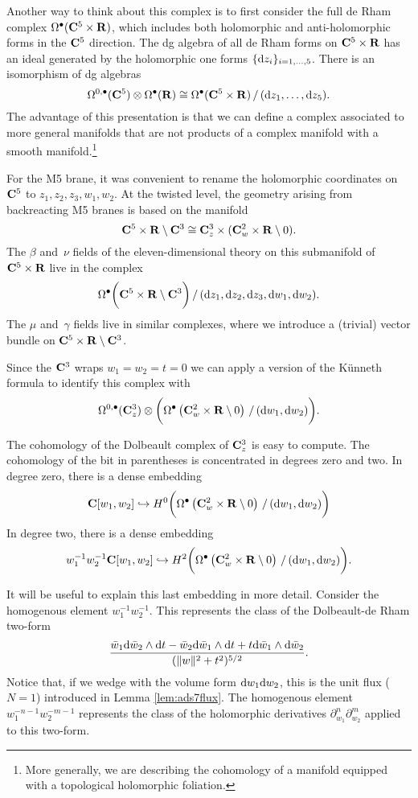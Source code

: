 \documentclass[../main.tex]{subfiles}
\begin{document}
Another way to think about this complex is to first consider the full de Rham complex $\Omega^\bullet(\mathbf{C}^5 \times \mathbf{R})$, which includes both holomorphic and anti-holomorphic forms in the $\mathbf{C}^5$ direction. 
The dg algebra of all de Rham forms on $\mathbf{C}^5 \times \mathbf{R}$ has an ideal generated by the holomorphic one forms $\{\mathrm{d} z_i\}_{i=1,\ldots,5}$.
There is an isomorphism of dg algebras
\[
\Omega^{0,\bullet}(\mathbf{C}^5) \otimes \Omega^\bullet(\mathbf{R}) \cong \Omega^\bullet(\mathbf{C}^5 \times \mathbf{R}) \, / \, (\mathrm{d} z_1,\ldots, \mathrm{d} z_5) .
\]
The advantage of this presentation is that we can define a complex associated to more general manifolds that are not products of a complex manifold with a smooth manifold.\footnote{More generally, we are describing the cohomology of a manifold equipped with a topological holomorphic foliation.}

For the M5 brane, it was convenient to rename the holomorphic coordinates on $\mathbf{C}^5$ to $z_1,z_2,z_3,w_1,w_2$. 
At the twisted level, the geometry arising from backreacting M5 branes is based on the manifold 
\[
\mathbf{C}^5 \times \mathbf{R} \setminus \mathbf{C}^3 \cong \mathbf{C}_z^3 \times (\mathbf{C}^2_w \times \mathbf{R} \setminus 0) .
\]
The $\beta$ and~$\nu$ fields of the eleven-dimensional theory on this submanifold of $\mathbf{C}^5 \times \mathbf{R}$ live in the complex 
\[
\Omega^\bullet\bigg(\mathbf{C}^5 \times \mathbf{R} \setminus \mathbf{C}^3\bigg) \, / \, (\mathrm{d} z_1,\mathrm{d} z_2,\mathrm{d} z_3, \mathrm{d} w_1, \mathrm{d} w_2)  .
\]
The $\mu$ and~$\gamma$ fields live in similar complexes, where we introduce a (trivial) vector bundle on $\mathbf{C}^5 \times \mathbf{R} \setminus \mathbf{C}^3$. 

Since the $\mathbf{C}^3$ wraps $w_1=w_2=t=0$ we can apply a version of the K\"unneth formula to identify this complex with 
\[
\Omega^{0,\bullet}(\mathbf{C}^3_z) \otimes \bigg( \Omega^\bullet\left(\mathbf{C}^2_w \times \mathbf{R} \setminus 0 \right) \, / \, (\mathrm{d} w_1, \mathrm{d} w_2) \bigg).
\]

The cohomology of the Dolbeault complex of $\mathbf{C}^3_z$ is easy to compute. 
The cohomology of the bit in parentheses is concentrated in degrees zero and two. 
In degree zero, there is a dense embedding
\[
\mathbf{C}[w_1,w_2] \hookrightarrow H^0 \bigg( \Omega^\bullet\left(\mathbf{C}^2_w \times \mathbf{R} \setminus 0 \right) \, / \, (\mathrm{d} w_1, \mathrm{d} w_2) \bigg)
\]
In degree two, there is a dense embedding
\[
w_{1}^{-1} w_2^{-1} \mathbf{C}[w_1,w_2] \hookrightarrow H^2 \bigg( \Omega^\bullet\left(\mathbf{C}^2_w \times \mathbf{R} \setminus 0 \right) \, / \, (\mathrm{d} w_1, \mathrm{d} w_2) \bigg).
\]

It will be useful to explain this last embedding in more detail. 
Consider the homogenous element $w_1^{-1} w_2^{-1}$. 
This represents the class of the Dolbeault-de Rham two-form
\[
\frac{\bar{w}_1 \mathrm{d} \bar{w}_2 \wedge \mathrm{d} t - \bar{w}_2 \mathrm{d} \bar{w}_1 \wedge \mathrm{d} t + t \mathrm{d} \bar{w}_1 \wedge \mathrm{d} \bar{w}_2}{(\|w\|^2 + t^2)^{5/2}} .
\]
Notice that, if we wedge with the volume form $\mathrm{d} w_1 \mathrm{d} w_2$, this is the unit  flux ($N=1$) introduced in Lemma \ref{lem:ads7flux}. 
The homogenous element $w_1^{-n-1} w_2^{-m-1}$ represents the class of the holomorphic derivatives $\partial_{w_1}^n \partial_{w_2}^{m}$ applied to this two-form. 
\end{document}
